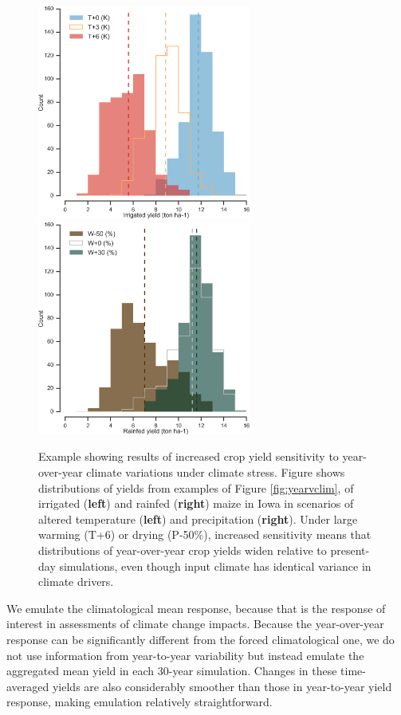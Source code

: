 \documentclass[gmd, manuscript]{copernicus} %
\begin{document}
\begin{figure}[ht]
\centering
   \includegraphics[width=7cm]{figures/hist_year_t.png} \hspace{10mm} \includegraphics[width=7cm]{figures/hist_year_pr.png}
   \caption{
   Example showing results of increased crop yield sensitivity to year-over-year climate variations under climate stress. 
   Figure shows distributions of yields from examples of Figure \ref{fig:yearvclim}, of irrigated (\textbf{left}) and rainfed (\textbf{right}) maize in Iowa in scenarios of altered temperature (\textbf{left}) and precipitation (\textbf{right}).
   Under large warming (T+6) or drying (P-50\%), increased sensitivity means that distributions of year-over-year crop yields widen relative to present-day simulations, even though input climate has identical variance in climate drivers.
   }
   \label{fig:yearly}
\end{figure}

We emulate the climatological mean response, because that is the response of interest in assessments of climate change impacts. 
Because the year-over-year response can be significantly different from the forced climatological one, we do not use information from year-to-year variability but instead emulate the aggregated mean yield in each 30-year simulation. 
Changes in these time-averaged yields are also considerably smoother than those in year-to-year yield response, making emulation relatively straightforward. 
\end{document}
